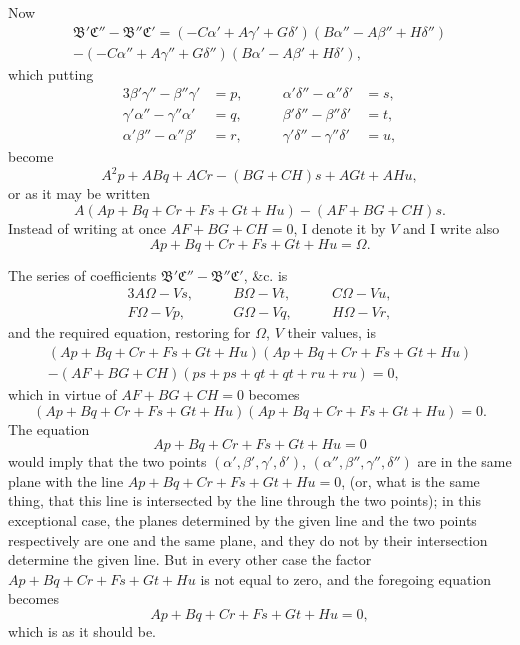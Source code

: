 \documentclass[11pt,a4paper]{article}
\theoremstyle{plain}
\begin{document}
Now
\begin{multline*}
\mathfrak{B}'\mathfrak{C}'' - \mathfrak{B}''\mathfrak{C}' = (-C\alpha' + A\gamma' + G\delta')(B\alpha'' - A\beta'' + H\delta'')\\
- (-C\alpha'' + A\gamma'' + G\delta'')(B\alpha' - A\beta' + H\delta'),
\end{multline*}
which putting
\begin{alignat*}{3}
\beta'\gamma'' - \beta''\gamma' &= p, &\qquad \alpha'\delta'' - \alpha''\delta' &= s,\\
\gamma'\alpha'' - \gamma''\alpha' &= q, &\qquad \beta'\delta'' - \beta''\delta' &= t,\\
\alpha'\beta'' - \alpha''\beta' &= r, &\qquad \gamma'\delta'' - \gamma''\delta' &= u,
\end{alignat*}
become
\[
A^2p + ABq + ACr - (BG + CH)s + AGt + AH u,
\]
or as it may be written
\[
A(Ap + Bq + Cr + Fs + Gt + Hu) - (AF + BG + CH)s.
\]
Instead of writing at once $AF + BG + CH = 0$, I denote it by $V$ and I write also
\[
Ap + Bq + Cr + Fs + Gt + Hu = \Omega.
\]

The series of coefficients $\mathfrak{B}'\mathfrak{C}'' - \mathfrak{B}''\mathfrak{C}'$, \&c. is
\begin{alignat*}{3}
A\Omega - Vs, &\qquad B\Omega - Vt, &\qquad C\Omega - Vu,\\
F\Omega - Vp, &\qquad G\Omega - Vq, &\qquad H\Omega - Vr,
\end{alignat*}
and the required equation, restoring for $\Omega$, $V$ their values, is
\begin{multline*}
(Ap + Bq + Cr + Fs + Gt + Hu)(Ap + Bq + Cr + Fs + Gt + Hu)\\
- (AF + BG + CH)(ps + ps + qt + qt + ru + ru) = 0,
\end{multline*}
which in virtue of $AF + BG + CH = 0$ becomes
\[
(Ap + Bq + Cr + Fs + Gt + Hu)(Ap + Bq + Cr + Fs + Gt + Hu) = 0.
\]
The equation
\[
Ap + Bq + Cr + Fs + Gt + Hu = 0
\]
would imply that the two points $(\alpha', \beta', \gamma', \delta')$, $(\alpha'', \beta'', \gamma'', \delta'')$ are in the same plane with the line $Ap + Bq + Cr + Fs + Gt + Hu = 0$, (or, what is the same thing, that this line is intersected by the line through the two points); in this exceptional case, the planes determined by the given line and the two points respectively are one and the same plane, and they do not by their intersection determine the given line. But in every other case the factor $Ap + Bq + Cr + Fs + Gt + Hu$ is not equal to zero, and the foregoing equation becomes
\[
Ap + Bq + Cr + Fs + Gt + Hu = 0,
\]
which is as it should be.
\end{document}
